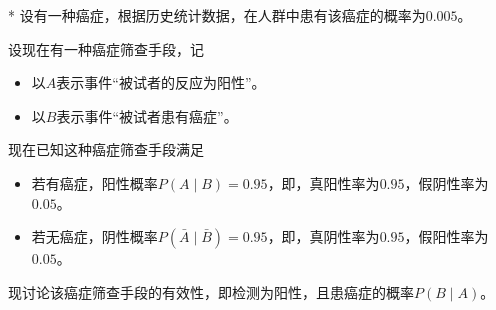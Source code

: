 
\begin{BoxExample}[条件概率的计算实例]*
    设有一种癌症，根据历史统计数据，在人群中患有该癌症的概率为$0.005$。

    设现在有一种癌症筛查手段，记
    \begin{itemize}
        \item 以$A$表示事件“被试者的反应为阳性”。
        \item 以$B$表示事件“被试者患有癌症”。
    \end{itemize}
    现在已知这种癌症筛查手段满足
    \begin{itemize}
        \item 若有癌症，阳性概率$P(A\mid B)=0.95$，即，真阳性率为$0.95$，假阴性率为$0.05$。
        \item 若无癌症，阴性概率$P(\bar{A}\mid \bar{B})=0.95$，即，真阴性率为$0.95$，假阳性率为$0.05$。
    \end{itemize}
    现讨论该癌症筛查手段的有效性，即检测为阳性，且患癌症的概率$P(B\mid A)$。
\end{BoxExample}

